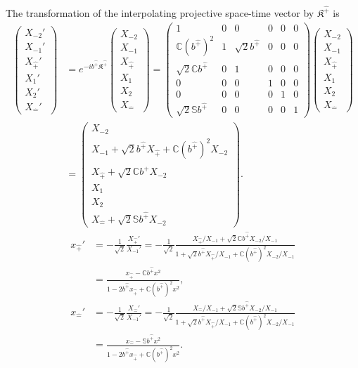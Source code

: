 \documentclass[foundations,article,submit,pdftex,moreauthors]{Definitions/mdpi}
\begin{document}
The transformation of the interpolating projective space-time vector by
$\mathfrak{K}^{\hat{+}}$ is
\begin{align}
\begin{pmatrix}
X_{-2}'\\ X_{-1}'\\ X_{\hat{+}}'\\ X_1'\\ X_2'\\ X_{\hat{-}}'
\end{pmatrix}
&=e^{-ib^{\hat{+}}\mathfrak{K}^{\hat{+}}}
\begin{pmatrix}
X_{-2}\\ X_{-1}\\ X_{\hat{+}}\\ X_1\\ X_2\\ X_{\hat{-}}
\end{pmatrix}
=\begin{pmatrix}
1 & 0 & 0 & 0 & 0 & 0\\
\mathbb{C} (b^{\hat{+}})^{2} & 1 & \sqrt{2} b^{\hat{+}} & 0 & 0 & 0\\
\sqrt{2} \mathbb{C} b^{\hat{+}} & 0 & 1 & 0 & 0 & 0\\
0 & 0 & 0 & 1 & 0 & 0\\
0 & 0 & 0 & 0 & 1 & 0\\
\sqrt{2} \mathbb{S} b^{\hat{+}} & 0 & 0 & 0 & 0 & 1
\end{pmatrix}
\begin{pmatrix}
X_{-2}\\ X_{-1}\\ X_{\hat{+}}\\ X_1\\ X_2\\ X_{\hat{-}}
\end{pmatrix}\\
&=\begin{pmatrix}
X_{-2}\\
X_{-1}+\sqrt{2}b^{\hat{+}}X_{\hat{+}}
+\mathbb{C}(b^{\hat{+}})^2X_{-2}\\
X_{\hat{+}}+\sqrt{2}\mathbb{C}b^{\hat{+}}X_{-2}\\
X_1\\
X_2\\
X_{\hat{-}}+\sqrt{2}\mathbb{S}b^{\hat{+}}X_{-2}
\end{pmatrix}.
\end{align}
\begin{align}
x_{\hat{+}}'
&=-\frac{1}{\sqrt{2}}\frac{X_{\hat{+}}'}{X_{-1}'}
=-\frac{1}{\sqrt{2}}
\frac{X_{\hat{+}}/X_{-1}+\sqrt{2}\mathbb{C}b^{\hat{+}}X_{-2}/X_{-1}}
{1+\sqrt{2}b^{\hat{+}}X_{\hat{+}}/X_{-1}
 +\mathbb{C}(b^{\hat{+}})^2X_{-2}/X_{-1}}\nonumber\\
&=\frac{x_{\hat{+}}-\mathbb{C}b^{\hat{+}}x^2}
{1-2b^{\hat{+}}x_{\hat{+}}+\mathbb{C}(b^{\hat{+}})^2x^2}, \nonumber\\
x_{\hat{-}}'
&=-\frac{1}{\sqrt{2}}\frac{X_{\hat{-}}'}{X_{-1}'}
=-\frac{1}{\sqrt{2}}
\frac{X_{\hat{-}}/X_{-1}+\sqrt{2}\mathbb{S}b^{\hat{+}}X_{-2}/X_{-1}}
{1+\sqrt{2}b^{\hat{+}}X_{\hat{+}}/X_{-1}
 +\mathbb{C}(b^{\hat{+}})^2X_{-2}/X_{-1}}\nonumber\\
&=\frac{x_{\hat{-}}-\mathbb{S}b^{\hat{+}}x^2}
{1-2b^{\hat{+}}x_{\hat{+}}+\mathbb{C}(b^{\hat{+}})^2x^2}.
\end{align}
\end{document}
